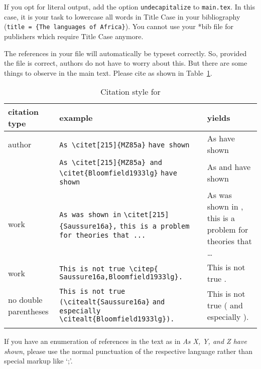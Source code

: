 {If you opt for literal output, add the option \verb+undecapitalize+ to \verb+main.tex+. In this case, it is your task to lowercase all words in Title Case in your bibliography (\verb+title = {The languages of Africa}+). You cannot use your *bib file for publishers which require Title Case anymore. 

The references in your \bibtex file will automatically be typeset correctly. So, provided the
\bibtex file is correct, authors do not have to worry about this. But there are some things to
observe in the main text. Please cite as shown in Table~\ref{tab-citation}.

\begin{table}[bt] 
\caption{Citation style for \lsp}%
\label{tab-citation}
\begin{tabular}{p{1.2cm}>{\small}p{6.2cm}p{3.8cm}}
\lsptoprule
citation type & example &yields\\
\midrule
author & \raggedright \verb+As \citet[215]{MZ85a}+
	  \verb+have shown+             &As \citet[215]{MZ85a} have shown\\ 
       & \raggedright  \verb+As \citet[215]{MZ85a} and+
	  \verb+\citet{Bloomfield1933lg}+
	  \verb+have shown+ 
					  &  As \citet[215]{MZ85a} and \citet{Bloomfield1933lg} have shown\\ 
work   & \raggedright  \verb+As was shown in+ 
	  \verb+\citet[215]{Saussure16a},+
	  \verb+this is a problem for theories that ...+ & As was shown in \citet[215]{Saussure16a}, this is a problem for theories that \ldots\\ 
work   & \raggedright  \verb+This is not true \citep{+  
	  \verb+Saussure16a,Bloomfield1933lg}.+ & This is not true \citep{Saussure16a,Bloomfield1933lg}.\\[2em]
no double parentheses   & \raggedright \verb+This is not true+
			    \verb+(\citealt{Saussure16a}+
			    \verb+and especially+
			    \verb+\citealt{Bloomfield1933lg}).+& This is not true (\citealt{Saussure16a} and especially \citealt{Bloomfield1933lg}).\\
\lspbottomrule
\end{tabular}

\end{table}
\nocite{Bresnan82b}%
 
If you have an enumeration of references in the text as in \emph{As X, Y, and Z have shown}, please use
the normal punctuation of the respective language rather than special markup like `;'.


}
